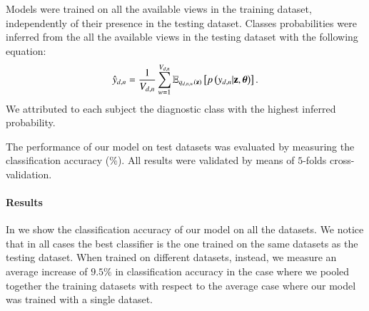 Models were trained on all the available views in the training dataset, independently of their presence in the testing dataset.
Classes probabilities were inferred from the all the available views in the testing dataset with the following equation:
\begin{equation}\label{eq:reconstructiony}
\begin{aligned}
\hat{y}_{d,n} = \frac{1}{V_{d, n}} \sum_{w=1}^{V_{d, n}} \operatorname{\mathbb{E}}_{q_{d,n,w}(\mathbf{z})}\left[p\left(y_{d,n}|\mathbf{z},\boldsymbol{\theta}\right)\right].
\end{aligned}
\end{equation}
We attributed to each subject the diagnostic class with the highest inferred probability.

The performance of our model on test datasets was evaluated by measuring the classification accuracy (\%).
All results were validated by means of $5$-folds cross-validation.

\paragraph{Results}
In  we show the classification accuracy of our model on all the datasets.
We notice that in all cases the best classifier is the one trained on the same datasets as the testing dataset.
When trained on different datasets, instead, we measure an average increase of $9.5\%$ in classification accuracy in the case where we pooled together the training datasets with respect to the average case where our model was trained with a single dataset.
